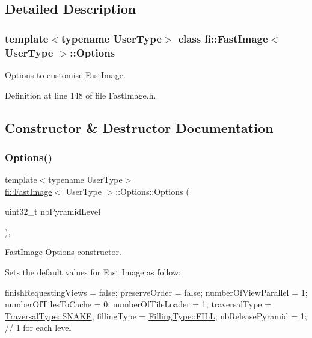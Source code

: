 \subsection{Detailed Description}
\subsubsection*{template$<$typename User\+Type$>$\newline
class fi\+::\+Fast\+Image$<$ User\+Type $>$\+::\+Options}

\hyperlink{classfi_1_1FastImage_1_1Options}{Options} to customise \hyperlink{classfi_1_1FastImage}{Fast\+Image}. 

Definition at line 148 of file Fast\+Image.\+h.



\subsection{Constructor \& Destructor Documentation}
\mbox{\label{classfi_1_1FastImage_1_1Options_a4a46b54745677fc1b88cffc2f8e53e2c}} 
\subsubsection{\texorpdfstring{Options()}{Options()}}
{\footnotesize\ttfamily template$<$typename User\+Type$>$ \\
\hyperlink{classfi_1_1FastImage}{fi\+::\+Fast\+Image}$<$ User\+Type $>$\+::Options\+::\+Options (\begin{DoxyParamCaption}\item[{uint32\+\_\+t}]{nb\+Pyramid\+Level }\end{DoxyParamCaption})\hspace{0.3cm}{\ttfamily [inline]}, {\ttfamily [explicit]}}



\hyperlink{classfi_1_1FastImage}{Fast\+Image} \hyperlink{classfi_1_1FastImage_1_1Options}{Options} constructor. 

Sets the default values for Fast Image as follow\+: 
\begin{DoxyCode}
finishRequestingViews = \textcolor{keyword}{false};
preserveOrder = \textcolor{keyword}{false};
numberOfViewParallel = 1;
numberOfTilesToCache = 0;
numberOfTileLoader = 1;
traversalType = \hyperlink{namespacefi_a7ba5ce68668e7f273b22e5f56ca6dfcba6a30da74d0b15b45ec14072c93b6645d}{TraversalType::SNAKE};
fillingType = \hyperlink{namespacefi_a6808b618c85d179a330ca388162215bdae8225b11842409df543692aebed34fd1}{FillingType::FILL};
nbReleasePyramid = 1; \textcolor{comment}{// 1 for each level}
\end{DoxyCode}



